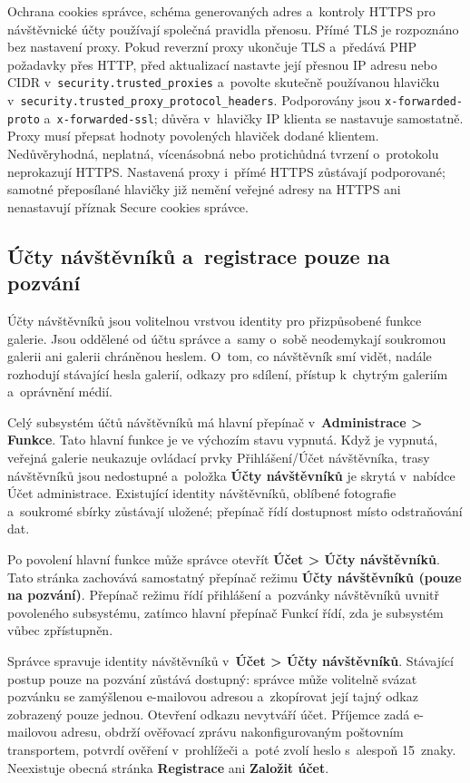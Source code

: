 \documentclass[11pt,a4paper]{article}
\newcommand{\ui}[1]{\textbf{#1}}
\newcommand{\codeword}[1]{\nolinkurl{#1}}
\begin{document}
Ochrana cookies správce, schéma generovaných adres a~kontroly HTTPS pro
návštěvnické účty používají společná pravidla přenosu. Přímé TLS je rozpoznáno
bez nastavení proxy. Pokud reverzní proxy ukončuje TLS a~předává PHP požadavky
přes HTTP, před aktualizací nastavte její přesnou IP adresu nebo CIDR
v~\codeword{security.trusted_proxies} a~povolte skutečně používanou hlavičku
v~\codeword{security.trusted_proxy_protocol_headers}. Podporovány jsou
\codeword{x-forwarded-proto} a~\codeword{x-forwarded-ssl}; důvěra v~hlavičky IP
klienta se nastavuje samostatně. Proxy musí přepsat hodnoty povolených hlaviček
dodané klientem. Nedůvěryhodná, neplatná, vícenásobná nebo protichůdná tvrzení
o~protokolu neprokazují HTTPS. Nastavená proxy i~přímé HTTPS zůstávají
podporované; samotné přeposílané hlavičky již nemění veřejné adresy na HTTPS ani
nenastavují příznak Secure cookies správce.

\subsection{Účty návštěvníků a~registrace pouze na pozvání}

Účty návštěvníků jsou volitelnou vrstvou identity pro přizpůsobené funkce
galerie. Jsou oddělené od účtu správce a~samy o~sobě neodemykají soukromou
galerii ani galerii chráněnou heslem. O~tom, co návštěvník smí vidět, nadále
rozhodují stávající hesla galerií, odkazy pro sdílení, přístup k~chytrým
galeriím a~oprávnění médií.

Celý subsystém účtů návštěvníků má hlavní přepínač v~\ui{Administrace > Funkce}.
Tato hlavní funkce je ve výchozím stavu vypnutá. Když je vypnutá, veřejná
galerie neukazuje ovládací prvky Přihlášení/Účet návštěvníka, trasy návštěvníků
jsou nedostupné a~položka \ui{Účty návštěvníků} je skrytá v~nabídce Účet
administrace. Existující identity návštěvníků, oblíbené fotografie a~soukromé
sbírky zůstávají uložené; přepínač řídí dostupnost místo odstraňování dat.

Po povolení hlavní funkce může správce otevřít \ui{Účet > Účty návštěvníků}.
Tato stránka zachovává samostatný přepínač režimu \ui{Účty návštěvníků (pouze na
pozvání)}. Přepínač režimu řídí přihlášení a~pozvánky návštěvníků uvnitř
povoleného subsystému, zatímco hlavní přepínač Funkcí řídí, zda je subsystém
vůbec zpřístupněn.

Správce spravuje identity návštěvníků v~\ui{Účet > Účty návštěvníků}. Stávající
postup pouze na pozvání zůstává dostupný: správce může volitelně svázat pozvánku
se zamýšlenou e-mailovou adresou a~zkopírovat její tajný odkaz zobrazený pouze
jednou. Otevření odkazu nevytváří účet. Příjemce zadá e-mailovou adresu, obdrží
ověřovací zprávu nakonfigurovaným poštovním transportem, potvrdí ověření
v~prohlížeči a~poté zvolí heslo s~alespoň 15~znaky. Neexistuje obecná stránka
\ui{Registrace} ani \ui{Založit účet}.
\end{document}

